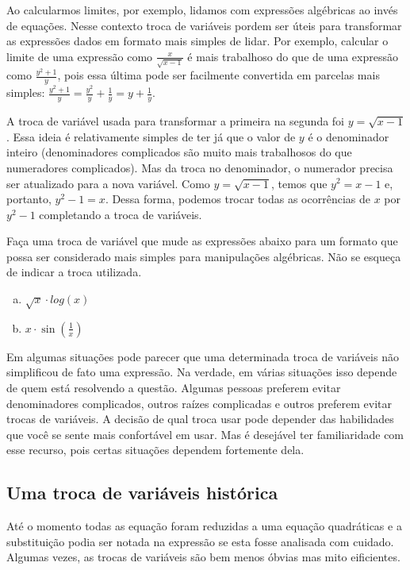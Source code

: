 \documentclass[main_estudante.tex]{subfiles}
\begin{document}
Ao calcularmos limites, por exemplo, lidamos com expressões algébricas ao invés de equações. Nesse contexto troca de variáveis pordem ser úteis para transformar as expressões dados em formato mais simples de lidar. Por exemplo, calcular o limite de uma expressão como $\frac{x}{\sqrt{x-1}}$ é mais trabalhoso do que de uma expressão como $\frac{y^2+1}{y}$, pois essa última pode ser facilmente convertida em parcelas mais simples: $\frac{y^2+1}{y}=\frac{y^2}{y}+\frac{1}{y}=y+\frac{1}{y}$.

A troca de variável usada para transformar a primeira na segunda foi $y=\sqrt{x-1}$. Essa ideia é relativamente simples de ter já que o valor de $y$ é o denominador inteiro (denominadores complicados são muito mais trabalhosos do que numeradores complicados). Mas da troca no denominador, o numerador precisa ser atualizado para a nova variável. Como $y=\sqrt{x-1}$, temos que $y^2=x-1$ e, portanto, $y^2-1=x$. Dessa forma, podemos trocar todas as ocorrências de $x$ por $y^2-1$ completando a troca de variáveis.

\begin{questao}
Faça uma troca de variável que mude as expressões abaixo para um formato que possa ser considerado mais simples para manipulações algébricas. Não se esqueça de indicar a troca utilizada.
\begin{enumerate}[a)]
\item $\sqrt{x} \cdot log(x)$
\item $x \cdot \sin(\frac{1}{x})$
\end{enumerate}
\end{questao}

Em algumas situações pode parecer que uma determinada troca de variáveis não simplificou de fato uma expressão. Na verdade, em várias situações isso depende de quem está resolvendo a questão. Algumas pessoas preferem evitar denominadores complicados, outros raízes complicadas e outros preferem evitar trocas de variáveis. A decisão de qual troca usar pode depender das habilidades que você se sente mais confortável em usar. Mas é desejável ter familiaridade com esse recurso, pois certas situações dependem fortemente dela.

\subsection*{Uma troca de variáveis histórica}

Até o momento todas as equação foram reduzidas a uma equação quadráticas e a substituição podia ser notada na expressão se esta fosse analisada com cuidado. Algumas vezes, as trocas de variáveis são bem menos óbvias mas mito eificientes.
\end{document}
